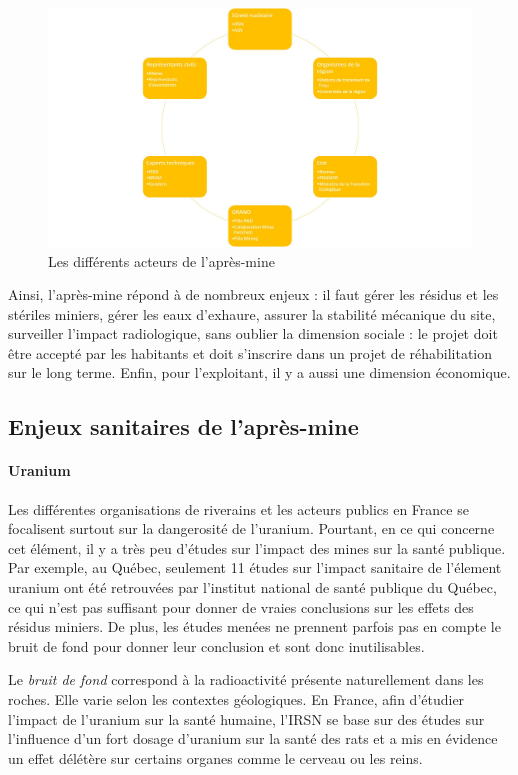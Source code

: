 \documentclass{article}
\begin{document}
\begin{figure}[H]
    \centering
    \includegraphics[width=0.9\linewidth]{I_B_3.jpg}
    \caption{Les différents acteurs de l'après-mine}
    \label{fig:acteurs_apres_mine}
\end{figure}

Ainsi, l’après-mine répond à de nombreux enjeux : il faut gérer les résidus et les stériles miniers, gérer les eaux d’exhaure, assurer la stabilité mécanique du site, surveiller l’impact radiologique, sans oublier la dimension sociale : le projet doit être accepté par les habitants et doit s’inscrire dans un projet de réhabilitation sur le long terme. Enfin, pour l’exploitant, il y a aussi une dimension économique.

\subsection{Enjeux sanitaires de l’après-mine}
\paragraph{Uranium}

Les différentes organisations de riverains et les acteurs publics en France se focalisent surtout sur la dangerosité de l’uranium. Pourtant, en ce qui concerne cet élément, il y a très peu d'études sur l’impact des mines sur la santé publique. Par exemple, au Québec, seulement 11 études sur l'impact sanitaire de l'élement uranium ont été retrouvées par l’institut national de santé publique du Québec, ce qui n’est pas suffisant pour donner de vraies conclusions sur les effets des résidus miniers. De plus, les études menées ne prennent parfois pas en compte le bruit de fond pour donner leur conclusion et sont donc inutilisables. 

Le \emph{bruit de fond} correspond à la radioactivité présente naturellement dans les roches. Elle varie selon les contextes géologiques. En France, afin d’étudier l’impact de l’uranium sur la santé humaine, l’IRSN se base sur des études sur l’influence d’un fort dosage d’uranium sur la santé des rats et a mis en évidence un effet délétère sur certains organes comme le cerveau ou les reins. 
\end{document}
